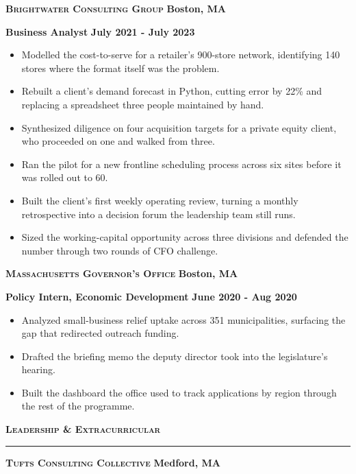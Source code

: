 \documentclass{article}
\newcommand{\vs}{\vspace{0.3cm}}
\begin{document}
\noindent \textbf{\textsc{Brightwater Consulting Group}} \hfill \textbf{Boston, MA}

\noindent \textbf{Business Analyst} \hfill \textbf{July 2021 - July 2023}
\begin{itemize}
	\item Modelled the cost-to-serve for a retailer's 900-store network, identifying 140 stores where the format itself was the problem.
	\item Rebuilt a client's demand forecast in Python, cutting error by 22\% and replacing a spreadsheet three people maintained by hand.
	\item Synthesized diligence on four acquisition targets for a private equity client, who proceeded on one and walked from three.
	\item Ran the pilot for a new frontline scheduling process across six sites before it was rolled out to 60.
	\item Built the client's first weekly operating review, turning a monthly retrospective into a decision forum the leadership team still runs.
	\item Sized the working-capital opportunity across three divisions and defended the number through two rounds of CFO challenge.
\end{itemize}

\noindent \textbf{\textsc{Massachusetts Governor's Office}} \hfill \textbf{Boston, MA}

\noindent \textbf{Policy Intern, Economic Development} \hfill \textbf{June 2020 - Aug 2020}
\begin{itemize}
	\item Analyzed small-business relief uptake across 351 municipalities, surfacing the gap that redirected outreach funding.
	\item Drafted the briefing memo the deputy director took into the legislature's hearing.
	\item Built the dashboard the office used to track applications by region through the rest of the programme.
\end{itemize}
\vs

\noindent \textbf{\textsc{\large Leadership \& Extracurricular}}

\noindent \rule[3pt]{\textwidth}{1pt}

\noindent \textbf{\textsc{Tufts Consulting Collective}} \hfill \textbf{Medford, MA}
\end{document}
